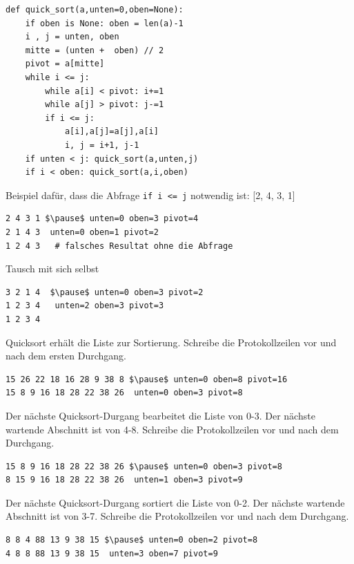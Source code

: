 \documentclass{beamer}
\begin{document}
\begin{frame}[fragile]
\begin{lstlisting} 
def quick_sort(a,unten=0,oben=None):
    if oben is None: oben = len(a)-1
    i , j = unten, oben
    mitte = (unten +  oben) // 2
    pivot = a[mitte]
    while i <= j:
        while a[i] < pivot: i+=1
        while a[j] > pivot: j-=1
        if i <= j:
            a[i],a[j]=a[j],a[i]
            i, j = i+1, j-1
    if unten < j: quick_sort(a,unten,j)
    if i < oben: quick_sort(a,i,oben)
\end{lstlisting} 
\end{frame}

\begin{frame}[fragile]

Beispiel dafür, dass die Abfrage \texttt{if i <= j} notwendig ist: [2, 4, 3, 1]  \pause
\begin{lstlisting} 
2 4 3 1 $\pause$ unten=0 oben=3 pivot=4
2 1 4 3  unten=0 oben=1 pivot=2
1 2 4 3   # falsches Resultat ohne die Abfrage
\end{lstlisting}  \pause

Tausch mit sich selbst
\begin{lstlisting} 
3 2 1 4  $\pause$ unten=0 oben=3 pivot=2
1 2 3 4   unten=2 oben=3 pivot=3
1 2 3 4
\end{lstlisting} 
\end{frame}

\begin{frame}[fragile]
Quicksort erhält die Liste zur Sortierung. Schreibe
die Protokollzeilen vor und nach dem ersten Durchgang.

\begin{lstlisting}
15 26 22 18 16 28 9 38 8 $\pause$ unten=0 oben=8 pivot=16
15 8 9 16 18 28 22 38 26  unten=0 oben=3 pivot=8
\end{lstlisting} \pause

Der nächste Quicksort-Durgang bearbeitet die Liste von 0-3. Der
nächste wartende Abschnitt ist von 4-8.
Schreibe die Protokollzeilen vor und nach dem Durchgang. 

\begin{lstlisting}
15 8 9 16 18 28 22 38 26 $\pause$ unten=0 oben=3 pivot=8
8 15 9 16 18 28 22 38 26  unten=1 oben=3 pivot=9
\end{lstlisting} \pause

Der nächste Quicksort-Durgang sortiert die Liste von 0-2. Der
nächste wartende Abschnitt ist von 3-7.
Schreibe die Protokollzeilen vor und nach dem Durchgang.

\begin{lstlisting}
8 8 4 88 13 9 38 15 $\pause$ unten=0 oben=2 pivot=8
4 8 8 88 13 9 38 15  unten=3 oben=7 pivot=9
\end{lstlisting}
\end{frame}
 
\end{document}
